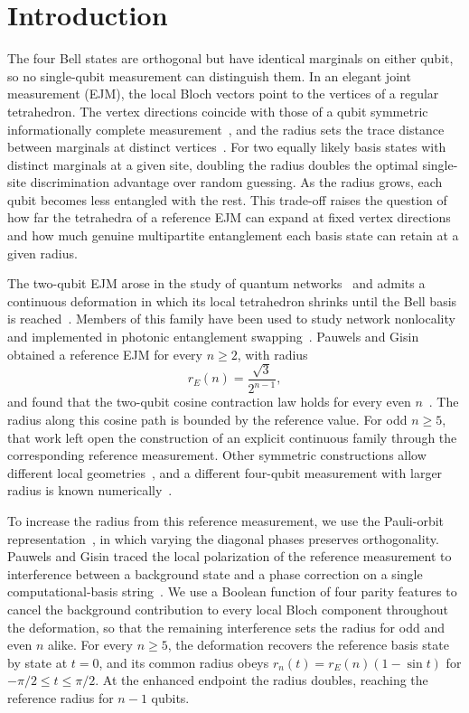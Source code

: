 \section{Introduction}
\label{intro:section}

The four Bell states are orthogonal but have identical marginals on either qubit, so no single-qubit measurement can distinguish them. In an elegant joint measurement (EJM), the local Bloch vectors point to the vertices of a regular tetrahedron. The vertex directions coincide with those of a qubit symmetric informationally complete measurement~\cite{Renes2004}, and the radius sets the trace distance between marginals at distinct vertices~\cite{Czartowski2021}. For two equally likely basis states with distinct marginals at a given site, doubling the radius doubles the optimal single-site discrimination advantage over random guessing. As the radius grows, each qubit becomes less entangled with the rest. This trade-off raises the question of how far the tetrahedra of a reference EJM can expand at fixed vertex directions and how much genuine multipartite entanglement each basis state can retain at a given radius.

The two-qubit EJM arose in the study of quantum networks~\cite{Gisin2017,Gisin2019} and admits a continuous deformation in which its local tetrahedron shrinks until the Bell basis is reached~\cite{Tavakoli2021}. Members of this family have been used to study network nonlocality~\cite{PozasKerstjens2022} and implemented in photonic entanglement swapping~\cite{Huang2022}. Pauwels and Gisin obtained a reference EJM for every $n\ge2$, with radius
\begin{equation}
 r_E(n)=\frac{\sqrt3}{2^{n-1}},
 \label{intro:reference-radius}
\end{equation}
and found that the two-qubit cosine contraction law holds for every even $n$~\cite{PauwelsGisin2026}. The radius along this cosine path is bounded by the reference value. For odd $n\ge5$, that work left open the construction of an explicit continuous family through the corresponding reference measurement. Other symmetric constructions allow different local geometries~\cite{Ding2025,He2026}, and a different four-qubit measurement with larger radius is known numerically~\cite{PauwelsGisin2026}.

To increase the radius from this reference measurement, we use the Pauli-orbit representation~\cite{PauwelsPauli2026,PauwelsEJM2026}, in which varying the diagonal phases preserves orthogonality. Pauwels and Gisin traced the local polarization of the reference measurement to interference between a background state and a phase correction on a single computational-basis string~\cite{PauwelsGisin2026}. We use a Boolean function of four parity features to cancel the background contribution to every local Bloch component throughout the deformation, so that the remaining interference sets the radius for odd and even $n$ alike. For every $n\ge5$, the deformation recovers the reference basis state by state at $t=0$, and its common radius obeys $r_n(t)=r_E(n)(1-\sin t)$ for $-\pi/2\le t\le\pi/2$. At the enhanced endpoint the radius doubles, reaching the reference radius for $n-1$ qubits.

